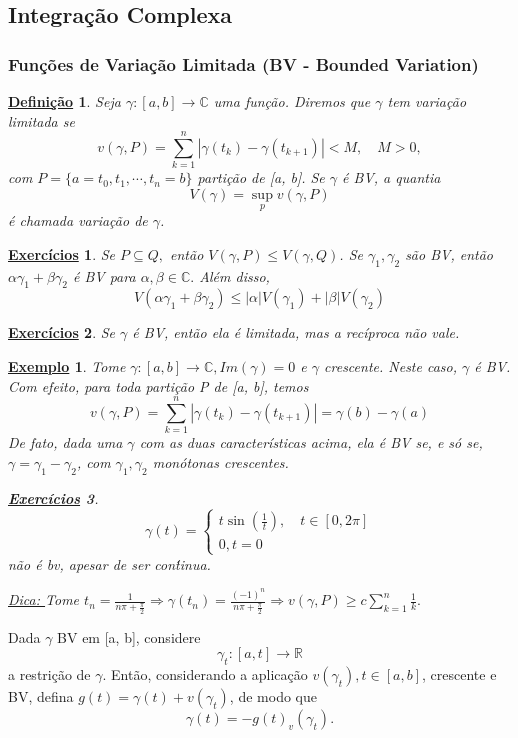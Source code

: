 \documentclass{article}
\newtheorem*{def*}{\underline{Defini\c c\~ao}}
\newtheorem{example}{\underline{Exemplo}}[section]
\newtheorem*{exer*}{\underline{Exerc\'icios}}
\begin{document}
 \subsection{Integra\c c\~ao Complexa}
 \subsubsection{Fun\c c\~oes de Varia\c c\~ao Limitada (BV - Bounded Variation)}
\begin{def*}
 Seja $\gamma:[a, b]\rightarrow \mathbb{C}$ uma fun\c c\~ao. Diremos que $\gamma$ tem varia\c c\~ao limitada se 
 $$
  v(\gamma, P) = \sum\limits_{k=1}^{n}|\gamma(t_{k}) - \gamma(t_{k+1})| < M, \quad M > 0,
 $$
 com $P = \{a=t_{0}, t_1, \cdots, t_n = b\} $ parti\c c\~ao de [a, b]. Se $\gamma$ \'e BV, a quantia
 $$
 V(\gamma) = \sup_p v(\gamma, P)
 $$
 \'e chamada varia\c c\~ao de $\gamma$.
\end{def*}
\begin{exer*}
  Se $P\subseteq{Q}, $ ent\~ao $V(\gamma, P)\leq{V(\gamma, Q)}$. Se $\gamma_1, \gamma_2$ s\~ao BV, ent\~ao $\alpha \gamma_1 + \beta \gamma_2$
\'e BV para $\alpha, \beta\in \mathbb{C}.$ Al\'em disso, 
  $$
  V(\alpha \gamma_1 + \beta \gamma_2) \leq |\alpha|V(\gamma_1) + |\beta|V(\gamma_2)
  $$
\end{exer*}
\begin{exer*}
  Se $\gamma$ \'e BV, ent\~ao ela \'e limitada, mas a rec\'iproca n\~ao vale.
\end{exer*}
\begin{example}
  Tome $\gamma:[a, b]\rightarrow \mathbb{C}, Im(\gamma) = 0$ e $\gamma$ crescente. Neste caso, $\gamma$ \'e BV. Com efeito, para
toda parti\c c\~ao P de [a, b], temos 
  $$
  v(\gamma, P) = \sum\limits_{k=1}^{n}|\gamma(t_{k}) - \gamma(t_{k+1})| = \gamma(b) - \gamma(a)
  $$
  De fato, dada uma $\gamma$ com as duas caracter\'isticas acima, ela \'e BV se, e s\'o se, $\gamma = \gamma_1 - \gamma_2$, com
 $\gamma_1, \gamma_2$ mon\'otonas crescentes.
 \begin{exer*}
   $$
   \gamma(t) = \left\{\begin{array}{ll}
       t\sin{(\frac{1}{t})}, \quad t\in[0, 2\pi] \\
       0, t= 0
  \end{array}\right.
  $$
  n\~ao \'e bv, apesar de ser con\'tinua.

  \underline{Dica: } Tome $t_{n} =\displaystyle \frac{1}{n\pi + \frac{\pi}{2}}\Rightarrow \gamma(t_{n}) =\displaystyle \frac{(-1)^n}{n\pi + \frac{\pi}{2}}\Rightarrow
v(\gamma, P) \geq c \sum\limits_{k=1}^{n}\frac{1}{k}.$
 \end{exer*}
\end{example}
Dada $\gamma$ BV em [a, b], considere 
  $$
  \gamma_t:[a, t]\rightarrow \mathbb{R}
  $$
  a restri\c c\~ao de $\gamma.$ Ent\~ao, considerando a aplica\c c\~ao $v(\gamma_t), t\in[a, b]$, crescente e BV, defina $
g(t) = \gamma(t) + v(\gamma_t)$, de modo que
  $$
  \gamma(t) = -g(t) _ v(\gamma_t).
  $$
  \newpage
\end{document}

